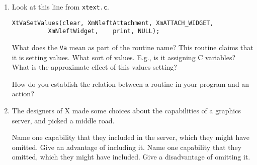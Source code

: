 \documentclass[twoside]{article}
\begin{document}
\begin{enumerate}
 While browsing the resources file for \verb+Netscape+, I
found this piece of a translation table.
\begin{verbatim}
*globalTranslations:                    #override                       \n\
        Meta ~Ctrl<Key>A:               addBookmark()                   \n\
         Alt ~Ctrl<Key>A:               addBookmark()                   \n\
        Meta ~Ctrl<Key>B:               viewBookmark()                  \n\
         Alt ~Ctrl<Key>B:               viewBookmark()                  \n\
        Meta ~Ctrl<Key>C:               copy()                          \n\
         Alt ~Ctrl<Key>C:               copy()                          
\end{verbatim}
Which are the actions, and which the events here?

\ite{2} While browsing the resources file for \verb+xcalc+, I
found this piece of a translation table.
\begin{verbatim}
*hp.bevel.screen.LCD.Translations:	#replace\n\
				<Key>p:pi()\n\
				<Key>i:inverse()\n\
*ti.button5.Translations: #override<Btn1Up>:off()unset()\n\
			  <Btn3Up>:quit()
\end{verbatim}
Which are the actions, and which the events here?
\asp{1}


\item Look at this line from \verb+xtext.c+.
\begin{verbatim}
XtVaSetValues(clear, XmNleftAttachment, XmATTACH_WIDGET,
	      XmNleftWidget, 	print, NULL);
\end{verbatim}
\begin{enumerate}
 What does the \verb+Va+ mean as part of the routine name?
\asp{.7}
\ite{1} This routine claims that it is setting values.  What sort
of values.  E.g., is it assigning C variables?
\asp{.7}
\ite{1} What is the approximate effect of this values setting?
\asp{.7}
\end{enumerate}


\ite{1} How do you establish the relation between a routine in your
program and an action?


\item The designers of X made some choices about the capabilities
of a graphics server, and picked a middle road.
\begin{enumerate}
\ite{2} Name one capability that they included in the server, which
they might have omitted.  Give an advantage of including it.
\ite{2} Name one capability that they omitted, which they might
have included.  Give a disadvantage of omitting it.
\end{enumerate}



\end{enumerate}
\end{document}
